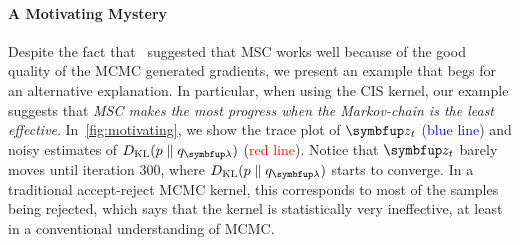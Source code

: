 \vspace{-0.1in}
\paragraph{A Motivating Mystery}
Despite the fact that~\citeauthor{NEURIPS2020_b2070693} suggested that MSC works well because of the good quality of the MCMC generated gradients, we present an example that begs for an alternative explanation.
In particular, when using the CIS kernel, our example suggests that \textit{MSC makes the most progress when the Markov-chain is the least effective}.
In~\cref{fig:motivating}, we show the trace plot of \(\vz_t\) (\textcolor{blue}{blue line}) and noisy estimates of \(\DKL{p}{q_{\vlambda}}\) (\textcolor{red}{red line}).
Notice that \(\vz_t\) barely moves until iteration 300, where \(\DKL{p}{q_{\vlambda}}\) starts to converge.
In a traditional accept-reject MCMC kernel, this corresponds to most of the samples being rejected, which says that the kernel is statistically very ineffective, at least in a conventional understanding of MCMC.


%


